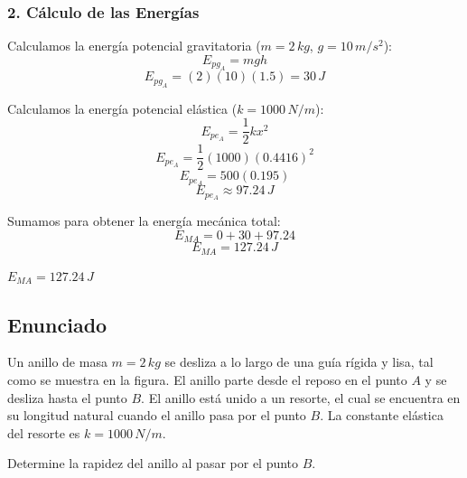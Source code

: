 \documentclass[12pt, a4paper]{article}
\begin{document}
\subsubsection*{2. Cálculo de las Energías}
Calculamos la energía potencial gravitatoria ($m = 2 \, \si{kg}$, $g = 10 \, \si{m/s^2}$):
$$ E_{pg_A} = m g h $$
$$ E_{pg_A} = (2)(10)(1.5) = 30 \, \si{J} $$

Calculamos la energía potencial elástica ($k = 1000 \, \si{N/m}$):
$$ E_{pe_A} = \frac{1}{2} k x^2 $$
$$ E_{pe_A} = \frac{1}{2} (1000) (0.4416)^2 $$
$$ E_{pe_A} = 500 (0.195) $$
$$ E_{pe_A} \approx 97.24 \, \si{J} $$

Sumamos para obtener la energía mecánica total:
$$ E_{MA} = 0 + 30 + 97.24 $$
$$ E_{MA} = 127.24 \, \si{J} $$

\begin{tcolorbox}[colback=green!5!white, colframe=green!50!black, title=Respuesta Final]
\centering \Large $E_{MA} = 127.24 \, \si{J}$
\end{tcolorbox}

\newpage

\subsection*{Enunciado}
Un anillo de masa $m = 2 \, \si{kg}$ se desliza a lo largo de una guía rígida y lisa, tal como se muestra en la figura. El anillo parte desde el reposo en el punto $A$ y se desliza hasta el punto $B$. El anillo está unido a un resorte, el cual se encuentra en su longitud natural cuando el anillo pasa por el punto $B$. La constante elástica del resorte es $k = 1000 \, \si{N/m}$. 

Determine la rapidez del anillo al pasar por el punto $B$.
\end{document}
